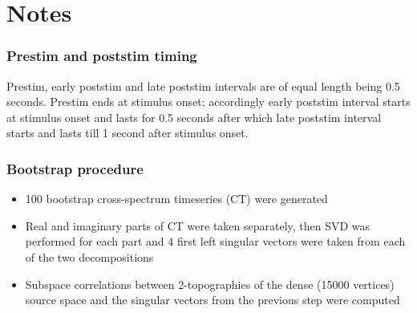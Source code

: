 \documentclass{article}
\begin{document}




\justify
\section{Notes}

\subsubsection{Prestim and poststim timing}
Prestim, early poststim and late poststim intervals are of equal length being 0.5 seconds.
Prestim ends at stimulus onset; accordingly early poststim interval starts at stimulus  onset and lasts
for 0.5 seconds after which late poststim interval starts and lasts till 1 second after stimulus onset.

\subsubsection{Bootstrap procedure}
\begin{itemize}
    \item 100 bootstrap cross-spectrum timeseries (CT) were generated
    \item Real and imaginary parts of CT were taken separately, then
          SVD was performed for each part and 4 first left singular vectors were taken
          from each of the two decompositions
    \item Subspace correlations between 2-topographies of the dense (15000 vertices)
          source space and the singular vectors from the previous step were computed
\end{itemize}
\end{document}
